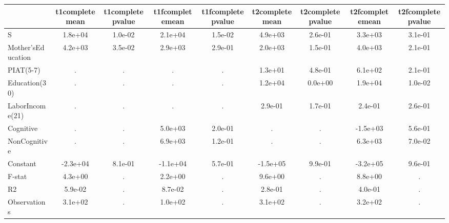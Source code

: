 \begin{table}[htbp]
\begin{tabular}{lcccccccc} \hline \hline
 & t1completemean  & t1completepvalue  & t1fcompletemean  & t1fcompletepvalue  & t2completemean  & t2completepvalue  & t2fcompletemean  & t2fcompletepvalue  \\  \hline 
S &  1.8e+04 &  1.0e-02 &  2.1e+04 &  1.5e-02 &  4.9e+03 &  2.6e-01 &  3.3e+03 &  3.1e-01 \\  
Mother'sEducation &  4.2e+03 &  3.5e-02 &  2.9e+03 &  2.9e-01 &  2.0e+03 &  1.5e-01 &  4.0e+03 &  2.1e-01 \\  
PIAT(5-7) &         . &         . &         . &         . &  1.3e+01 &  4.8e-01 &  6.1e+02 &  2.1e-01 \\  
Education(30) &         . &         . &         . &         . &  1.2e+04 &  0.0e+00 &  1.9e+04 &  1.0e-02 \\  
LaborIncome(21) &         . &         . &         . &         . &  2.9e-01 &  1.7e-01 &  2.4e-01 &  2.6e-01 \\  
Cognitive &         . &         . &  5.0e+03 &  2.0e-01 &         . &         . & -1.5e+03 &  5.6e-01 \\  
NonCognitive &         . &         . &  6.9e+03 &  1.2e-01 &         . &         . &  6.3e+03 &  7.0e-02 \\  
Constant & -2.3e+04 &  8.1e-01 & -1.1e+04 &  5.7e-01 & -1.5e+05 &  9.9e-01 & -3.2e+05 &  9.6e-01 \\  
F-stat &  4.3e+00 &         . &  2.2e+00 &         . &  9.6e+00 &         . &  8.8e+00 &         . \\  
R2 &  5.9e-02 &         . &  8.7e-02 &         . &  2.8e-01 &         . &  4.0e-01 &         . \\  
Observations &  3.1e+02 &         . &  1.0e+02 &         . &  3.1e+02 &         . &  3.2e+02 &         . \\  
\hline \hline \end{tabular}
\end{table}
